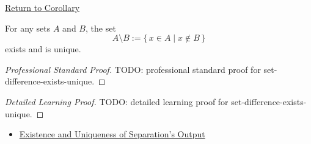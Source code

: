 \newpage
{}
\label{prf:set-difference-exists-unique}

\begin{remark*}[Return]
\hyperref[cor:set-difference-exists-unique]{Return to Corollary}
\end{remark*}

\begin{corollary*}
For any sets $A$ and $B$, the set
\[
  A\setminus B:=\{\,x\in A\mid x\notin B\,\}
\]
exists and is unique.
\end{corollary*}

\begin{proof}[Professional Standard Proof]
\LRAProofBodyStart
TODO: professional standard proof for set-difference-exists-unique.
\end{proof}

\begin{proof}[Detailed Learning Proof]
\LRAProofBodyStart
TODO: detailed learning proof for set-difference-exists-unique.
\end{proof}

\begin{remark*}
\end{remark*}

\begin{dependencies}
\begin{itemize}
  \item \hyperref[thm:separation-output-exists-unique]{Existence and Uniqueness of Separation's Output}
\end{itemize}
\end{dependencies}

\clearpage
